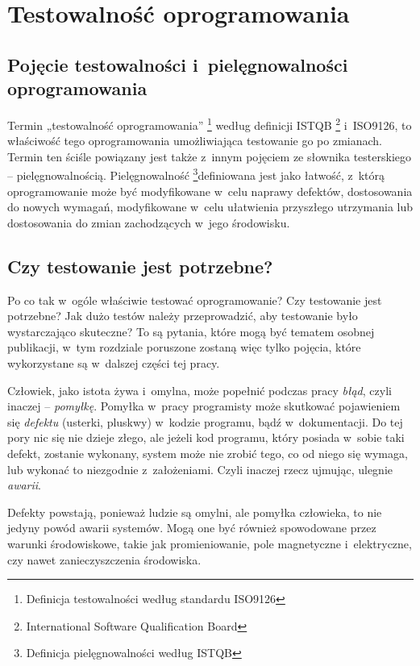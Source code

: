 \chapter{Testowalność oprogramowania}
\label{testowalnosc}
\section{Pojęcie testowalności i~pielęgnowalności \newline oprogramowania}
Termin „testowalność oprogramowania” \footnote{Definicja testowalności według standardu ISO9126}  według definicji ISTQB \footnote{International Software Qualification Board}  i~ISO9126, to właściwość tego oprogramowania umożliwiająca testowanie go po zmianach. Termin ten ściśle powiązany jest także z~innym pojęciem ze słownika testerskiego – pielęgnowalnością. Pielęgnowalność \footnote{Definicja pielęgnowalności według ISTQB}definiowana jest jako łatwość, z~którą oprogramowanie może być modyfikowane w~celu naprawy defektów, dostosowania do nowych wymagań, modyfikowane w~celu ułatwienia przyszłego utrzymania lub dostosowania do zmian zachodzących w~jego środowisku.

\section{Czy testowanie jest potrzebne?}
\label{czy_testowanie_potrzebne}
Po co tak w~ogóle właściwie testować oprogramowanie? Czy testowanie jest potrzebne? Jak dużo testów należy przeprowadzić, aby testowanie było wystarczająco skuteczne? To są pytania, które mogą być tematem osobnej publikacji, w~tym rozdziale poruszone zostaną więc tylko pojęcia, które wykorzystane są w~dalszej części tej pracy.

Człowiek, jako istota żywa i~omylna, może popełnić podczas pracy \textit{błąd}, czyli inaczej – \textit{pomyłkę}. Pomyłka w~pracy programisty może skutkować pojawieniem się \textit{defektu} (usterki, pluskwy) w~kodzie programu, bądź w~dokumentacji. Do tej pory nic się nie dzieje złego, ale jeżeli kod programu, który posiada w~sobie taki defekt, zostanie wykonany, system może nie zrobić tego, co od niego się wymaga, lub wykonać to niezgodnie z~założeniami. Czyli inaczej rzecz ujmując, ulegnie \textit{awarii}. 

Defekty powstają, ponieważ ludzie są omylni, ale pomyłka człowieka, to nie jedyny powód awarii systemów. Mogą one być również spowodowane przez warunki środowiskowe, takie jak promieniowanie, pole magnetyczne i~elektryczne, czy nawet zanieczyszczenia środowiska.

